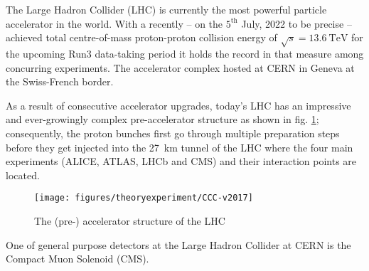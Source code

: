 \label{sec:theory}

The Large Hadron Collider (LHC) is currently the most powerful particle accelerator in the world. With a recently -- on the $\text{5}^{\text{th}}$ July, 2022 to be precise -- achieved total centre-of-mass proton-proton collision energy of $\sqrt{s} = \SI{13.6}{\tera\electronvolt}$ for the upcoming Run3 data-taking period it holds the record in that measure among concurring experiments. The accelerator complex hosted at CERN in Geneva at the Swiss-French border.

As a result of consecutive accelerator upgrades, today's LHC has an impressive and ever-growingly complex pre-accelerator structure as shown in fig. \ref{fig:lhcstructure}; consequently, the proton bunches first go through multiple preparation steps before they get injected into the \SI{27}{\kilo\meter} tunnel of the LHC where the four main experiments (ALICE, ATLAS, LHCb and CMS) and their interaction points are located.

\begin{figure}[h!]
	\centering
	\texttt{[image: figures/theoryexperiment/CCC-v2017]}
	\caption{The (pre-) accelerator structure of the LHC \cite{Mobs:2197559}}
	\label{fig:lhcstructure}
\end{figure}



One of general purpose detectors at the Large Hadron Collider at CERN is the Compact Muon Solenoid (CMS).
